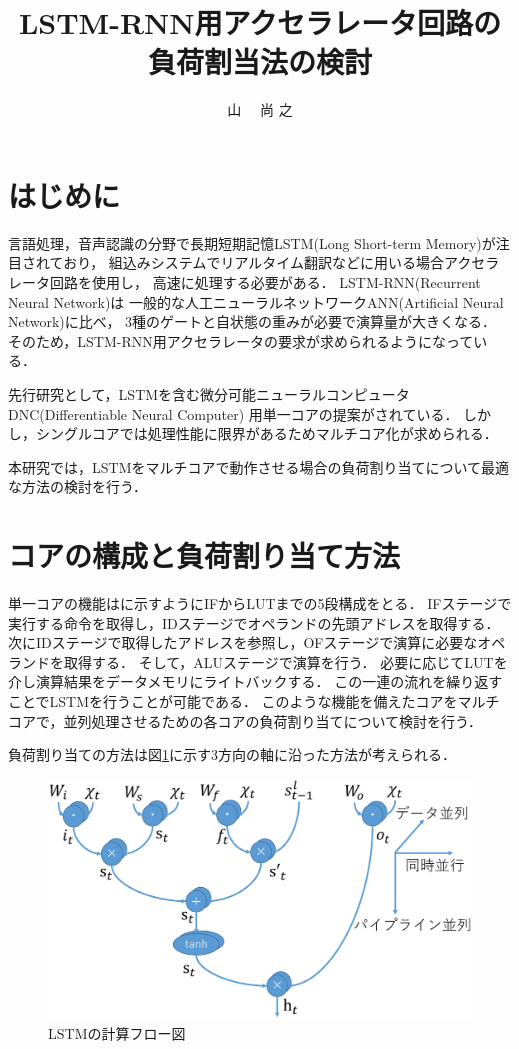\documentclass[a4j]{jarticle}
\title{LSTM-RNN用アクセラレータ回路の負荷割当法の検討}
\author{山 \UTF{FA11} ~~尚 之}
\begin{document}
\begin{Abstract}

 \section{はじめに}

言語処理，音声認識の分野で長期短期記憶LSTM(Long Short-term Memory)が注目されており，
組込みシステムでリアルタイム翻訳などに用いる場合アクセラレータ回路を使用し，
高速に処理する必要がある．
LSTM-RNN(Recurrent Neural Network)は
一般的な人工ニューラルネットワークANN(Artificial Neural Network)に比べ，
3種のゲートと自状態の重みが必要で演算量が大きくなる．
そのため，LSTM-RNN用アクセラレータの要求が求められるようになっている．

先行研究として，LSTMを含む微分可能ニューラルコンピュータDNC(Differentiable Neural Computer)
用単一コアの提案がされている\cite{bib:pre-method}．
しかし，シングルコアでは処理性能に限界があるためマルチコア化が求められる．

本研究では，LSTMをマルチコアで動作させる場合の負荷割り当てについて最適な方法の検討を行う．



 \section{コアの構成と負荷割り当て方法}
単一コアの機能はに示すようにIFからLUTまでの5段構成をとる．
IFステージで実行する命令を取得し，IDステージでオペランドの先頭アドレスを取得する．
次にIDステージで取得したアドレスを参照し，OFステージで演算に必要なオペランドを取得する．
そして，ALUステージで演算を行う．
必要に応じてLUTを介し演算結果をデータメモリにライトバックする．
この一連の流れを繰り返すことでLSTMを行うことが可能である．
このような機能を備えたコアをマルチコアで，並列処理させるための各コアの負荷割り当てについて検討を行う．


 負荷割り当ての方法は図\ref{フロー図}に示す3方向の軸に沿った方法が考えられる．
 \begin{figure}[h]
  \centering
  \includegraphics[scale=0.25]{flow.eps}
  \caption{LSTMの計算フロー図}
  \label{フロー図}
 \end{figure}



\end{Abstract}
\end{document}
